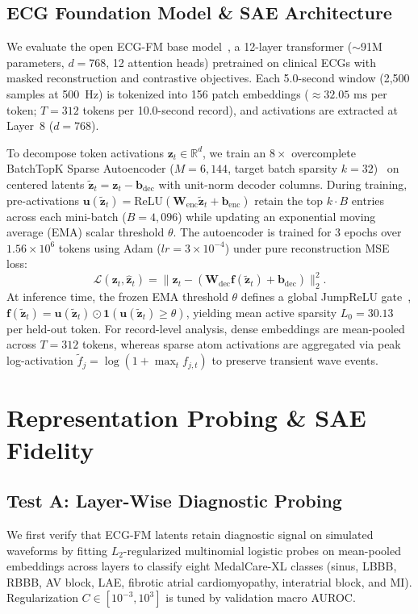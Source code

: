 \documentclass[10pt,twocolumn,letterpaper]{article}
\begin{document}
\subsection{ECG Foundation Model \& SAE Architecture}
We evaluate the open ECG-FM base model~\cite{mckeen2025ecgfm}, a 12-layer transformer ($\sim$91M parameters, $d = 768$, 12 attention heads) pretrained on clinical ECGs with masked reconstruction and contrastive objectives. Each 5.0-second window (2,500 samples at 500~Hz) is tokenized into 156 patch embeddings ($\approx 32.05\text{ ms}$ per token; $T = 312$ tokens per 10.0-second record), and activations are extracted at Layer~8 ($d = 768$).

To decompose token activations $\bm{z}_t \in \mathbb{R}^d$, we train an $8\times$ overcomplete BatchTopK Sparse Autoencoder ($M = 6{,}144$, target batch sparsity $k = 32$)~\cite{bussmann2024batchtopk} on centered latents $\tilde{\bm{z}}_t = \bm{z}_t - \bm{b}_{\text{dec}}$ with unit-norm decoder columns. During training, pre-activations $\bm{u}(\tilde{\bm{z}}_t) = \text{ReLU}(\bm{W}_{\text{enc}}\tilde{\bm{z}}_t + \bm{b}_{\text{enc}})$ retain the top $k \cdot B$ entries across each mini-batch ($B = 4{,}096$) while updating an exponential moving average (EMA) scalar threshold $\theta$. The autoencoder is trained for 3 epochs over $1.56 \times 10^6$ tokens using Adam ($lr = 3 \times 10^{-4}$) under pure reconstruction MSE loss:
\begin{equation}
    \mathcal{L}(\bm{z}_t, \hat{\bm{z}}_t) = \|\bm{z}_t - (\bm{W}_{\text{dec}}\bm{f}(\tilde{\bm{z}}_t) + \bm{b}_{\text{dec}})\|_2^2.
\end{equation}
At inference time, the frozen EMA threshold $\theta$ defines a global JumpReLU gate~\cite{rajamanoharan2024jumprelu}, $\bm{f}(\tilde{\bm{z}}_t) = \bm{u}(\tilde{\bm{z}}_t) \odot \mathbf{1}(\bm{u}(\tilde{\bm{z}}_t) \ge \theta)$, yielding mean active sparsity $L_0 = 30.13$ per held-out token. For record-level analysis, dense embeddings are mean-pooled across $T = 312$ tokens, whereas sparse atom activations are aggregated via peak log-activation $\tilde{f}_j = \log(1 + \max_t f_{j,t})$ to preserve transient wave events.

\section{Representation Probing \& SAE Fidelity}

\subsection{Test A: Layer-Wise Diagnostic Probing}
We first verify that ECG-FM latents retain diagnostic signal on simulated waveforms by fitting $L_2$-regularized multinomial logistic probes on mean-pooled embeddings across layers to classify eight MedalCare-XL classes (sinus, LBBB, RBBB, AV block, LAE, fibrotic atrial cardiomyopathy, interatrial block, and MI). Regularization $C \in [10^{-3}, 10^3]$ is tuned by validation macro AUROC.
\end{document}
